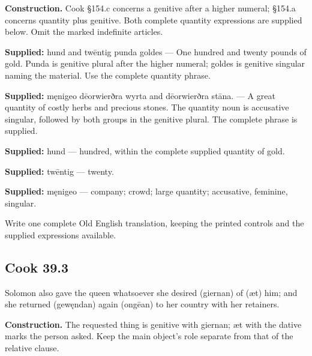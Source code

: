 \textbf{Construction.} Cook §154.c concerns a genitive after a higher numeral; §154.a concerns quantity plus genitive. Both complete quantity expressions are supplied below. Omit the marked indefinite articles.

\textbf{Supplied:} hund and twēntig punda goldes — One hundred and twenty pounds of gold. Punda is genitive plural after the higher numeral; goldes is genitive singular naming the material. Use the complete quantity phrase.

\textbf{Supplied:} męnigeo dēorwierðra wyrta and dēorwierðra stāna. — A great quantity of costly herbs and precious stones. The quantity noun is accusative singular, followed by both groups in the genitive plural. The complete phrase is supplied.

\textbf{Supplied:} hund — hundred, within the complete supplied quantity of gold.

\textbf{Supplied:} twēntig — twenty.

\textbf{Supplied:} męnigeo — company; crowd; large quantity; accusative, feminine, singular.

Write one complete Old English translation, keeping the printed controls and the supplied expressions available.

\par\begin{minipage}{\linewidth}\raggedright
\subsection*{Cook 39.3}

Solomon also gave the queen whatsoever she desired (giernan) of (æt) him; and she returned (gewęndan) again (ongēan) to her country with her retainers.

\textbf{Construction.} The requested thing is genitive with giernan; æt with the dative marks the person asked. Keep the main object’s role separate from that of the relative clause.

\end{minipage}\par\addvspace{4pt}


